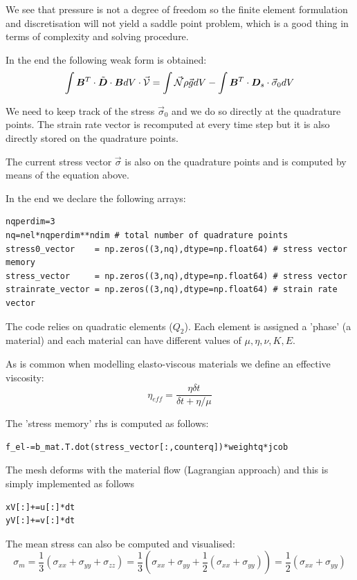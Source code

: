We see that pressure is not a degree of freedom so the finite element
formulation and discretisation will not yield a saddle point problem, 
which is a good thing in terms of complexity and solving procedure.

In the end the following weak form is obtained:
\[
\int {\bm B}^T \cdot \tilde{\bm D} \cdot {\bm B} dV \cdot \vec{\cal V} 
= \int \vec{{\mathcal{N}}} \rho \vec{g} dV -\int {\bm B}^T \cdot {\bm D}_s \cdot \vec{\sigma}_0 dV
\]

We need to keep track of the stress $\vec{\sigma}_0$ and 
we do so directly at the quadrature points.
The strain rate vector is recomputed at every time step but it is also 
directly stored on the quadrature points.

The current stress vector $\vec{\sigma}$ is also on the quadrature points and
is computed by means of the equation above.

In the end we declare the following arrays:
\begin{lstlisting}
nqperdim=3
nq=nel*nqperdim**ndim # total number of quadrature points
stress0_vector    = np.zeros((3,nq),dtype=np.float64) # stress vector memory
stress_vector     = np.zeros((3,nq),dtype=np.float64) # stress vector 
strainrate_vector = np.zeros((3,nq),dtype=np.float64) # strain rate vector
\end{lstlisting}

The code relies on quadratic elements ($Q_2$).
Each element is assigned a 'phase' (a material) and 
each material can have different values of $\mu, \eta, \nu, K, E$.

As is common when modelling elasto-viscous materials
we define an effective viscosity:
\[
\eta_{eff} 
= \frac{\eta \delta t}{\delta t + \eta/\mu} 
\]

The 'stress memory' rhs is computed as follows:
\begin{lstlisting}
f_el-=b_mat.T.dot(stress_vector[:,counterq])*weightq*jcob
\end{lstlisting}



The mesh deforms with the material flow (Lagrangian approach)
and this is simply implemented as follows 

\begin{lstlisting}
xV[:]+=u[:]*dt
yV[:]+=v[:]*dt
\end{lstlisting}

The mean stress can also be computed and visualised:
\[
\sigma_m 
= \frac{1}{3}(\sigma_{xx}+\sigma_{yy}+\sigma_{zz})
= \frac{1}{3}(\sigma_{xx}+\sigma_{yy}+\frac12(\sigma_{xx}+\sigma_{yy}))
= \frac{1}{2}(\sigma_{xx}+\sigma_{yy})
\]

